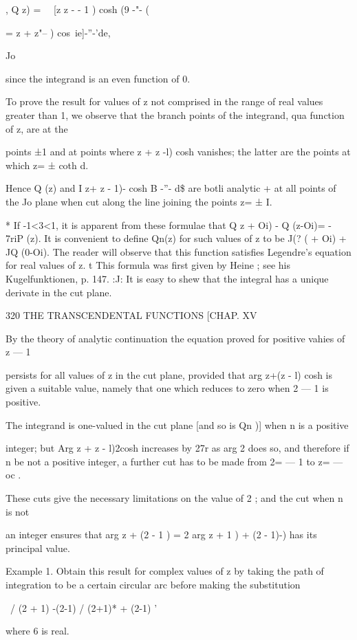 {{, Q z) = \ \ [z z - - 1 ) cosh (9 -"- (

= z + z"-- ) cos\ ie]-''-'de,

Jo

since the integrand is an even function of 0.

To prove the result for values of z not comprised in the range of real
values greater than 1, we observe that the branch points of the
integrand, qua function of z, are at the

points ±1 and at points where z + z -l) cosh vanishes; the latter are
the points at which z= ± coth d.

Hence Q (z) and I z+ z - 1)- cosh B -''- d\$ are botli analytic + at
all points of the Jo plane when cut along the line joining the points
z= ± I.

* If -1<3<1, it is apparent from these formulae that Q z + Oi) - Q
(z-Oi)= - 7riP (z). It is convenient to define Qn(z) for such values
of z to be J(? ( + Oi) + JQ (0-Oi). The reader will observe that this
function satisfies Legendre's equation for real values of z. t This
formula was first given by Heine ; see his Kugelfunktionen, p. 147.
:J: It is easy to shew that the integral has a unique derivate in the
cut plane.

320 THE TRANSCENDENTAL FUNCTIONS [CHAP. XV

By the theory of analytic continuation the equation proved for
positive vahies of z — 1

persists for all values of z in the cut plane, provided that arg z+(z
- l) cosh is given a suitable value, namely that one which reduces to
zero when 2 — 1 is positive.

The integrand is one-valued in the cut plane [and so is Qn )] when n
is a positive

integer; but Arg z + z - l)2cosh increases by 27r as arg 2 does so,
and therefore if n be not a positive integer, a further cut has to be
made from 2= — 1 to z= — oc .

These cuts give the necessary limitations on the value of 2 ; and the
cut when n is not

an integer ensures that arg z + (2 - 1 ) = 2 arg z + 1 ) + (2 - 1)-)
has its principal value.

Example 1. Obtain this result for complex values of z by taking the
path of integration to be a certain circular arc before making the
substitution

 \ / (2 + 1) -(2-1) / (2+1)* + (2-1) '

where 6 is real.

}}
